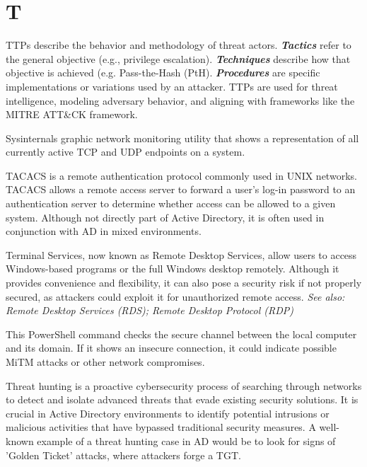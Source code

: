 \section*{T}
 TTPs describe the behavior and methodology of threat actors. \textit{\textbf{Tactics}} refer to the general objective (e.g., privilege escalation). \textbf{\textit{Techniques}} describe how that objective is achieved (e.g. Pass-the-Hash (PtH). \textbf{\textit{Procedures}} are specific implementations or variations used by an attacker. TTPs are used for threat intelligence, modeling adversary behavior, and aligning with frameworks like the MITRE ATT\&CK framework.

  Sysinternals graphic network monitoring utility that shows a representation of all currently active TCP and UDP endpoints on a system.

 TACACS is a remote authentication protocol commonly used in UNIX networks. TACACS allows a remote access server to forward a user's log-in password to an authentication server to determine whether access can be allowed to a given system. Although not directly part of Active Directory, it is often used in conjunction with AD in mixed environments.

 Terminal Services, now known as Remote Desktop Services, allow users to access Windows-based programs or the full Windows desktop remotely. Although it provides convenience and flexibility, it can also pose a security risk if not properly secured, as attackers could exploit it for unauthorized remote access.
\textit{See also: Remote Desktop Services (RDS); Remote Desktop Protocol (RDP)}

 This PowerShell command checks the secure channel between the local computer and its domain. If it shows an insecure connection, it could indicate possible MiTM attacks or other network compromises.

 Threat hunting is a proactive cybersecurity process of searching through networks to detect and isolate advanced threats that evade existing security solutions. It is crucial in Active Directory environments to identify potential intrusions or malicious activities that have bypassed traditional security measures. A well-known example of a threat hunting case in AD would be to look for signs of 'Golden Ticket' attacks, where attackers forge a TGT.

